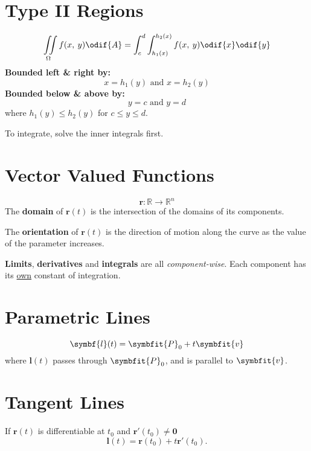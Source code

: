 \documentclass{article}
\begin{document}
\begin{multicols}{3}
    \section*{Type II Regions}
    \begin{equation*}
        \iint\limits_{\Omega} f(x,\: y) \odif{A} = \int_c^d\int_{h_1(x)}^{h_2(x)} f(x,\: y) \odif{x} \odif{y}
    \end{equation*}
    \textbf{Bounded left \& right by:}
    \begin{equation*}
        x=h_1(y) \text{ and } x=h_2(y)
    \end{equation*}
    \textbf{Bounded below \& above by:}
    \begin{equation*}
        y=c \text{ and } y=d
    \end{equation*}
    where \(h_1(y) \leq h_2(y)\) for \(c \leq y \leq d\).

    To integrate, solve the inner integrals first.
    \section*{Vector Valued Functions}
    \begin{equation*}
        \symbf{r}:\mathbb{R} \to \mathbb{R}^n
    \end{equation*}
    The \textbf{domain} of \(\symbf{r}(t)\) is the intersection of the domains
    of its components.

    The \textbf{orientation} of \(\symbf{r}(t)\) is the direction of motion along the
    curve as the value of the parameter increases.

    \textbf{Limits}, \textbf{derivatives} and \textbf{integrals} are all \textit{component-wise}. Each component has its \underline{own} constant of integration.
    \section*{Parametric Lines}
    \begin{equation*}
        \symbf{l}(t) = \symbfit{P}_0 + t\symbfit{v}
    \end{equation*}
    where \(\symbf{l}(t)\) passes through \(\symbfit{P}_0\), and is parallel to \(\symbfit{v}\).
    \section*{Tangent Lines}
    If \(\symbf{r}(t)\) is differentiable at
    \(t_0\) and \(\symbf{r'}(t_0)\ne\symbf{0}\)
    \begin{equation*}
        \symbf{l}(t) = \symbf{r}(t_0)+t\symbf{r'}(t_0).
    \end{equation*}

\end{multicols}
\end{document}
